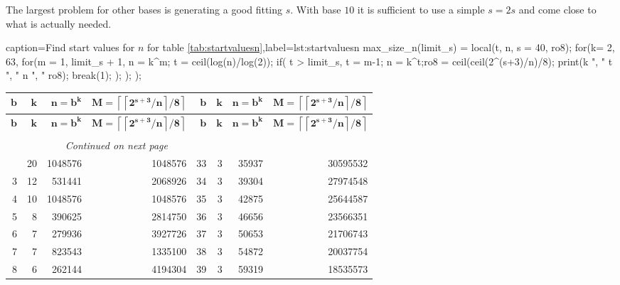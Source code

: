 \documentclass[a4paper,10pt]{article}
\providecommand{\ceil}[1]{\left\lceil#1\right\rceil}
\theoremstyle{plain} %
\theoremstyle{definition}
\theoremstyle{remark}
\begin{document}
The largest problem for other bases is generating a good fitting $s$. With base $10$ it is sufficient to use a simple $s = 2s$ and come close to what is actually needed.
\lstset{language=parigp}
\begin{pblisting}{caption={Find start values for $n$ for table \ref{tab:startvaluesn}},label=lst:startvaluesn}
max_size_n(limit_s) = {
   local(t, n, s = 40, ro8);
   for(k= 2, 63,
      for(m = 1, limit_s + 1,
         n = k^m; t = ceil(log(n)/log(2));
         if( t > limit_s,
            t = m-1; n = k^t;ro8 = ceil(ceil(2^(s+3)/n)/8);
            print(k ", " t ", " n ", " ro8);
            break(1);
         );
      );
   );
}

\end{pblisting}
\begin{center}
\begin{longtable}{r r r r | r r r r}
\multicolumn{1}{r}{$\mathbf{b}$}&
\multicolumn{1}{r}{$\mathbf{k}$}&
\multicolumn{1}{r}{$\mathbf{n = b^k}$}&
\multicolumn{1}{r}{$\mathbf{M = \ceil{\ceil{2^{s+3}/n}/8}}$}&
\multicolumn{1}{r}{$\mathbf{b}$}&
\multicolumn{1}{r}{$\mathbf{k}$}&
\multicolumn{1}{r}{$\mathbf{n = b^k}$}&
\multicolumn{1}{r}{$\mathbf{M = \ceil{\ceil{2^{s+3}/n}/8}}$}\\
\endfirsthead
%
\multicolumn{1}{r}{$\mathbf{b}$}&
\multicolumn{1}{r}{$\mathbf{k}$}&
\multicolumn{1}{r}{$\mathbf{n = b^k}$}&
\multicolumn{1}{r}{$\mathbf{M = \ceil{\ceil{2^{s+3}/n}/8}}$}&
\multicolumn{1}{r}{$\mathbf{b}$}&
\multicolumn{1}{r}{$\mathbf{k}$}&
\multicolumn{1}{r}{$\mathbf{n = b^k}$}&
\multicolumn{1}{r}{$\mathbf{M = \ceil{\ceil{2^{s+3}/n}/8}}$}\\
\endhead
\rule{0pt}{1ex}\\
\multicolumn{6}{c}{{\footnotesize{\textit{Continued on next page}}}} \\
\endfoot
\endlastfoot
2  & 20 & 1048576 & 1048576  &  33 & 3  & 35937   & 30595532 \\
3  & 12 & 531441  & 2068926  &  34 & 3  & 39304   & 27974548 \\
4  & 10 & 1048576 & 1048576  &  35 & 3  & 42875   & 25644587 \\
5  & 8  & 390625  & 2814750  &  36 & 3  & 46656   & 23566351 \\
6  & 7  & 279936  & 3927726  &  37 & 3  & 50653   & 21706743 \\
7  & 7  & 823543  & 1335100  &  38 & 3  & 54872   & 20037754 \\
8  & 6  & 262144  & 4194304  &  39 & 3  & 59319   & 18535573 \\

\end{longtable}
\end{center}
\end{document}
